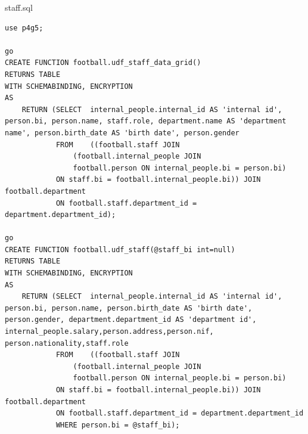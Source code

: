 \documentclass[pdftex,12pt,a4paper]{report}
\begin{document}
staff.sql
\begin{lstlisting} 
use p4g5;

go
CREATE FUNCTION football.udf_staff_data_grid()
RETURNS TABLE
WITH SCHEMABINDING, ENCRYPTION
AS
	RETURN (SELECT	internal_people.internal_id AS 'internal id', person.bi, person.name, staff.role, department.name AS 'department name', person.birth_date AS 'birth date', person.gender
			FROM	((football.staff JOIN 
				(football.internal_people JOIN
				football.person ON internal_people.bi = person.bi)
			ON staff.bi = football.internal_people.bi)) JOIN football.department
			ON football.staff.department_id = department.department_id);
			
go
CREATE FUNCTION football.udf_staff(@staff_bi int=null) 
RETURNS TABLE
WITH SCHEMABINDING, ENCRYPTION
AS
	RETURN (SELECT	internal_people.internal_id AS 'internal id', person.bi, person.name, person.birth_date AS 'birth date', person.gender,	department.department_id AS 'department id',	internal_people.salary,person.address,person.nif, person.nationality,staff.role						
			FROM	((football.staff JOIN 
				(football.internal_people JOIN
				football.person ON internal_people.bi = person.bi)
			ON staff.bi = football.internal_people.bi)) JOIN football.department
			ON football.staff.department_id = department.department_id
			WHERE person.bi = @staff_bi);
\end{lstlisting}
\end{document}
